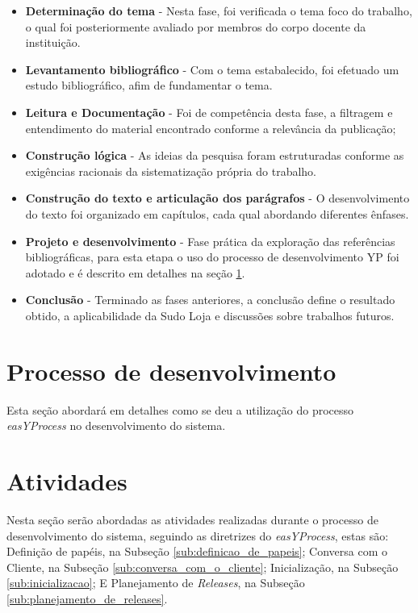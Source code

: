 \documentclass[a4paper,12pt]{monografia}
\begin{document}
\begin{itemize}
	\item \textbf{Determinação do tema} - Nesta fase, foi verificada o tema foco do trabalho, o qual foi posteriormente avaliado por membros do corpo docente da instituição.

	\item \textbf{Levantamento bibliográfico} - Com o tema estabalecido, foi efetuado um estudo bibliográfico, afim de fundamentar o tema.

	\item \textbf{Leitura e Documentação} - Foi de competência desta fase, a filtragem e entendimento do material encontrado conforme a relevância da publicação;

	\item \textbf{Construção lógica} - As ideias da pesquisa foram estruturadas conforme as exigências racionais da sistematização própria do trabalho.

	\item \textbf{Construção do texto e articulação dos parágrafos} - O desenvolvimento do texto foi organizado em capítulos, cada qual abordando diferentes ênfases.

	\item \textbf{Projeto e desenvolvimento} - Fase prática da exploração das referências bibliográficas, para esta etapa o uso do processo de desenvolvimento YP foi adotado e é descrito em detalhes na seção \ref{sec:processo_de_desenvolvimento}.

	\item \textbf{Conclusão} - Terminado as fases anteriores, a conclusão define o resultado obtido, a aplicabilidade da Sudo Loja e discussões sobre trabalhos futuros.
\end{itemize}

\section{Processo de desenvolvimento} %
\label{sec:processo_de_desenvolvimento}

Esta seção abordará em detalhes como se deu a utilização do processo \textit{easYProcess} no desenvolvimento do sistema.

\section{Atividades} %
\label{sec:atividades}

Nesta seção serão abordadas as atividades realizadas durante o processo de desenvolvimento do sistema, seguindo as diretrizes do \textit{easYProcess}, estas são: Definição de papéis, na Subseção \ref{sub:definicao_de_papeis}; Conversa com o Cliente, na Subseção \ref{sub:conversa_com_o_cliente}; Inicialização, na Subseção \ref{sub:inicializacao}; E Planejamento de \textit{Releases}, na Subseção \ref{sub:planejamento_de_releases}.
\end{document}
